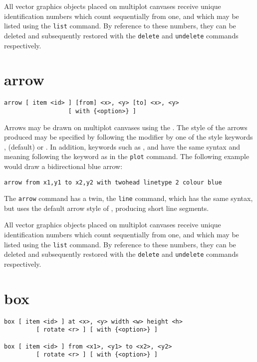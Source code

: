 All vector graphics objects placed on multiplot canvases receive unique
identification numbers which count sequentially from one, and which may be
listed using the {\tt list} command.  By reference to these numbers, they can
be deleted and subsequently restored with the {\tt delete} and {\tt undelete}
commands respectively.


\section{arrow}

\begin{verbatim}
arrow [ item <id> ] [from] <x>, <y> [to] <x>, <y>
                  [ with {<option>} ]
\end{verbatim}

Arrows may be drawn on multiplot canvases using the . The style
of the arrows produced may be specified by following the 
modifier by one of the style keywords , 
(default) or . In addition, keywords such as ,
 and  have the same syntax and meaning
following the keyword  as in the {\tt plot} command. The
following example would draw a bidirectional blue arrow:

\begin{verbatim}
arrow from x1,y1 to x2,y2 with twohead linetype 2 colour blue
\end{verbatim}

The {\tt arrow} command has a twin, the {\tt line} command, which has the same
syntax, but uses the default arrow style of , producing short
line segments.

All vector graphics objects placed on multiplot canvases receive unique
identification numbers which count sequentially from one, and which may be
listed using the {\tt list} command.  By reference to these numbers, they can
be deleted and subsequently restored with the {\tt delete} and {\tt undelete}
commands respectively.


\section{box}

\begin{verbatim}
box [ item <id> ] at <x>, <y> width <w> height <h>
         [ rotate <r> ] [ with {<option>} ]

box [ item <id> ] from <x1>, <y1> to <x2>, <y2>
         [ rotate <r> ] [ with {<option>} ]
\end{verbatim}

